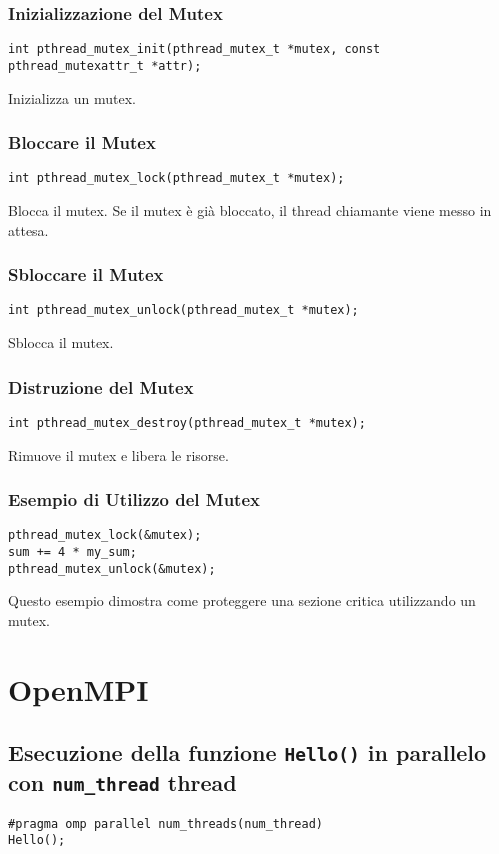 \documentclass[a4paper,12pt]{article}
\begin{document}
\subsubsection{Inizializzazione del Mutex}
\begin{lstlisting}
int pthread_mutex_init(pthread_mutex_t *mutex, const pthread_mutexattr_t *attr);
\end{lstlisting}
Inizializza un mutex.

\subsubsection{Bloccare il Mutex}
\begin{verbatim}
int pthread_mutex_lock(pthread_mutex_t *mutex);
\end{verbatim}
Blocca il mutex. Se il mutex è già bloccato, il thread chiamante viene messo in attesa.

\subsubsection{Sbloccare il Mutex}
\begin{verbatim}
int pthread_mutex_unlock(pthread_mutex_t *mutex);
\end{verbatim}
Sblocca il mutex.

\subsubsection{Distruzione del Mutex}
\begin{verbatim}
int pthread_mutex_destroy(pthread_mutex_t *mutex);
\end{verbatim}
Rimuove il mutex e libera le risorse.

\subsubsection{Esempio di Utilizzo del Mutex}
\begin{verbatim}
pthread_mutex_lock(&mutex);
sum += 4 * my_sum;
pthread_mutex_unlock(&mutex);
\end{verbatim}
Questo esempio dimostra come proteggere una sezione critica utilizzando un mutex.

\section{OpenMPI}

\subsection{Esecuzione della funzione \texttt{Hello()} in parallelo con \texttt{num\_thread} thread}
\begin{verbatim}
#pragma omp parallel num_threads(num_thread)
Hello();
\end{verbatim}
\end{document}
